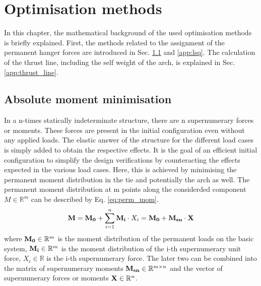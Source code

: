 \newpage
\section{Optimisation methods}
In this chapter, the mathematical background of the used optimisation methods is briefly explained. First, the methods related to the assignment of the permanent hanger forces are introduced in Sec. \ref{app:moment_min} and \ref{app:lsq}. The calculation of the thrust line, including the self weight of the arch, is explained in Sec. \ref{app:thrust_line}.

\subsection{Absolute moment minimisation} \label{app:moment_min}
In a n-times statically indeterminate structure, there are n supernumerary forces or moments. These forces are present in the initial configuration even without any applied loads. The elastic answer of the structure for the different load cases is simply added to obtain the respective effects. It is the goal of an efficient initial configuration to simplify the design verifications by counteracting the effects expected in the various load cases. Here, this is achieved by minimising the permanent moment distribution in the tie and potentially the arch as well. The permanent moment distribution at m points along the considerded component $M \in \mathbb{R}^m$ can be described by Eq. \eqref{eq:perm_mom}. 
\begin{equation}
    {\bf M} = {\bf M_0} + \sum_{i=1}^{n} {\bf M_i} \cdot X_i = {\bf M_0} + {\bf M_{sn}} \cdot {\bf X}
    \label{eq:perm_mom}
\end{equation}
where ${\bf M_0} \in \mathbb{R}^m$ is the moment distribution of the permanent loads on the basic system, ${\bf M_i} \in \mathbb{R}^m$ is the moment distribution of the i-th supernumerary unit force, ${X_i} \in \mathbb{R}$ is the i-th supernumerary force. The later two can be combined into the matrix of supernumerary moments ${\bf M_{sn}} \in  \mathbb{R}^{m\times n}$ and the vector of supernumerary forces or moments ${\bf X} \in \mathbb{R}^n$.

